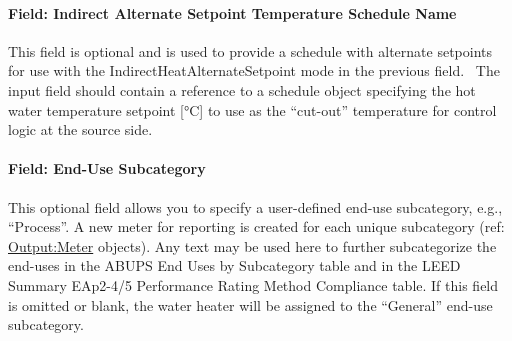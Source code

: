 \paragraph{Field: Indirect Alternate Setpoint Temperature Schedule Name}\label{field-indirect-alternate-setpoint-temperature-schedule-name}

This field is optional and is used to provide a schedule with alternate setpoints for use with the IndirectHeatAlternateSetpoint mode in the previous field.~ The input field should contain a reference to a schedule object specifying the hot water temperature setpoint {[}°C{]} to use as the ``cut-out'' temperature for control logic at the source side.

\paragraph{Field: End-Use Subcategory}

This optional field allows you to specify a user-defined end-use subcategory, e.g., ``Process''. A new meter for reporting is created for each unique subcategory (ref: \hyperref[outputmeter-and-outputmetermeterfileonly]{Output:Meter} objects). Any text may be used here to further subcategorize the end-uses in the ABUPS End Uses by Subcategory table and in the LEED Summary EAp2-4/5 Performance Rating Method Compliance table. If this field is omitted or blank, the water heater will be assigned to the ``General'' end-use subcategory.


